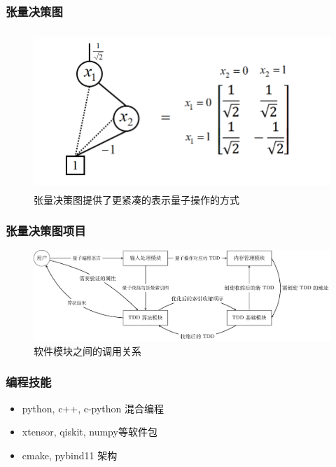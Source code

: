 \documentclass[aspectratio=1610]{beamer}
\begin{document}
\begin{frame}
\frametitle{张量决策图}
\begin{figure}
    \centering
    \includegraphics[height=6cm]{TDD_H_gate2.png}
    \caption{张量决策图提供了更紧凑的表示量子操作的方式}
\end{figure}
\end{frame}
\begin{frame}
\frametitle{张量决策图项目}
\begin{figure}[htbp]
    \includegraphics[width=\textwidth]{alg_flow.pdf}
    \caption{软件模块之间的调用关系}
    \label{fig-flow}
\end{figure}
\end{frame}

\begin{frame}
\frametitle{编程技能}
\begin{itemize}
    \item python, c++, c-python 混合编程
    \item xtensor, qiskit, numpy等软件包
    \item cmake, pybind11 架构
\end{itemize}
\end{frame}
\end{document}

